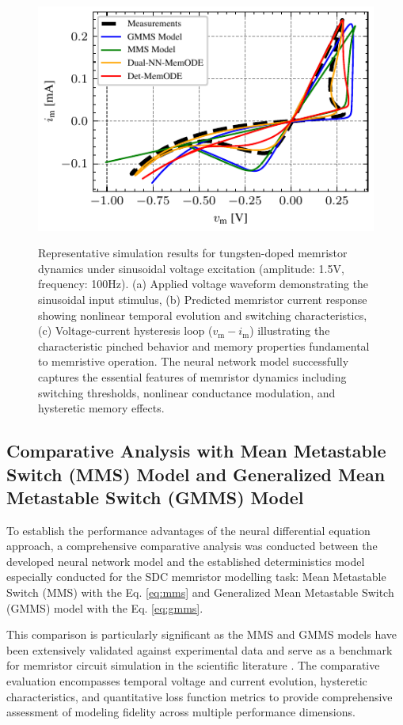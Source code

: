 \documentclass[lettersize,journal]{IEEEtran}
\begin{document}
\begin{figure}[!t]
{    \includegraphics[width=\subwidth]{sample_results/sol_plots_amp_1.5_freq_100.0_fig_2.pdf}%
  }
  \caption{Representative simulation results for tungsten-doped memristor dynamics under sinusoidal voltage excitation (amplitude: 1.5V, frequency: 100Hz). (a) Applied voltage waveform demonstrating the sinusoidal input stimulus, (b) Predicted memristor current response showing nonlinear temporal evolution and switching characteristics, (c) Voltage-current hysteresis loop (\(v_{\mathrm{m}} - i_{\mathrm{m}}\)) illustrating the characteristic pinched behavior and memory properties fundamental to memristive operation. The neural network model successfully captures the essential features of memristor dynamics including switching thresholds, nonlinear conductance modulation, and hysteretic memory effects.}
  \label{fig:sample-results}
\end{figure}


\subsection{Comparative Analysis with Mean Metastable Switch (MMS) Model and Generalized Mean Metastable Switch (GMMS) Model}

\noindent
To establish the performance advantages of the neural differential equation approach, a comprehensive comparative analysis was conducted between the developed neural network model and the established deterministics model especially conducted for the SDC memristor modelling task: Mean Metastable Switch (MMS) with the Eq. \eqref{eq:mms} and Generalized Mean Metastable Switch (GMMS) model with the Eq. \eqref{eq:gmms}.

This comparison is particularly significant as the MMS and GMMS models have been extensively validated against experimental data and serve as a benchmark for memristor circuit simulation in the scientific literature \autocite{Bednarz2024, Ostrovskii2021}. The comparative evaluation encompasses temporal voltage and current evolution, hysteretic characteristics, and quantitative loss function metrics to provide comprehensive assessment of modeling fidelity across multiple performance dimensions.
\end{document}
